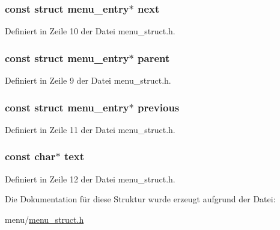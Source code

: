 \hypertarget{structmenu__entry_a8667330bb5cb56772e88abd901064211}{}
\subsubsection[{next}]{\setlength{\rightskip}{0pt plus 5cm}const struct {\bf menu\+\_\+entry}$\ast$ next}\label{structmenu__entry_a8667330bb5cb56772e88abd901064211}


Definiert in Zeile 10 der Datei menu\+\_\+struct.\+h.

\hypertarget{structmenu__entry_ac1b562fabcc9402003931e8351d6faf7}{}
\subsubsection[{parent}]{\setlength{\rightskip}{0pt plus 5cm}const struct {\bf menu\+\_\+entry}$\ast$ parent}\label{structmenu__entry_ac1b562fabcc9402003931e8351d6faf7}


Definiert in Zeile 9 der Datei menu\+\_\+struct.\+h.

\hypertarget{structmenu__entry_a66676e2c3f7553b50a8c1d0c4e973734}{}
\subsubsection[{previous}]{\setlength{\rightskip}{0pt plus 5cm}const struct {\bf menu\+\_\+entry}$\ast$ previous}\label{structmenu__entry_a66676e2c3f7553b50a8c1d0c4e973734}


Definiert in Zeile 11 der Datei menu\+\_\+struct.\+h.

\hypertarget{structmenu__entry_a16343090e80c4472521560f30113d96c}{}
\subsubsection[{text}]{\setlength{\rightskip}{0pt plus 5cm}const char$\ast$ text}\label{structmenu__entry_a16343090e80c4472521560f30113d96c}


Definiert in Zeile 12 der Datei menu\+\_\+struct.\+h.



Die Dokumentation für diese Struktur wurde erzeugt aufgrund der Datei\+:\begin{DoxyCompactItemize}
\item 
menu/\hyperlink{menu__struct_8h}{menu\+\_\+struct.\+h}\end{DoxyCompactItemize}
